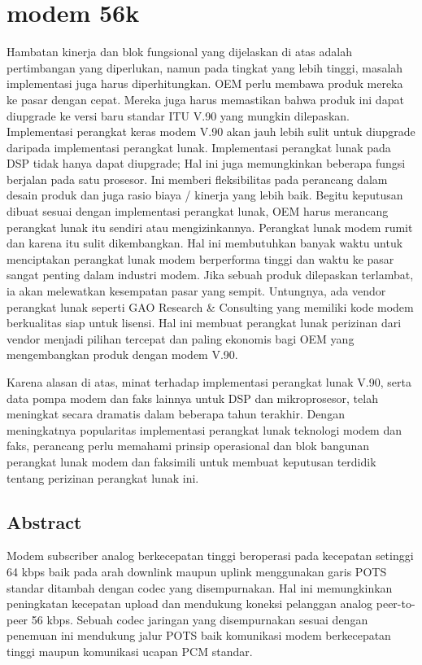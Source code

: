 \section{modem 56k}
Hambatan kinerja dan blok fungsional yang dijelaskan di atas adalah pertimbangan yang diperlukan, namun pada tingkat yang lebih tinggi, masalah implementasi juga harus diperhitungkan. OEM perlu membawa produk mereka ke pasar dengan cepat. Mereka juga harus memastikan bahwa produk ini dapat diupgrade ke versi baru standar ITU V.90 yang mungkin dilepaskan. Implementasi perangkat keras modem V.90 akan jauh lebih sulit untuk diupgrade daripada implementasi perangkat lunak. Implementasi perangkat lunak pada DSP tidak hanya dapat diupgrade; Hal ini juga memungkinkan beberapa fungsi berjalan pada satu prosesor. Ini memberi fleksibilitas pada perancang dalam desain produk dan juga rasio biaya / kinerja yang lebih baik. Begitu keputusan dibuat sesuai dengan implementasi perangkat lunak, OEM harus merancang perangkat lunak itu sendiri atau mengizinkannya. Perangkat lunak modem rumit dan karena itu sulit dikembangkan. Hal ini membutuhkan banyak waktu untuk menciptakan perangkat lunak modem berperforma tinggi dan waktu ke pasar sangat penting dalam industri modem. Jika sebuah produk dilepaskan terlambat, ia akan melewatkan kesempatan pasar yang sempit. Untungnya, ada vendor perangkat lunak seperti GAO Research \& Consulting yang memiliki kode modem berkualitas siap untuk lisensi. Hal ini membuat perangkat lunak perizinan dari vendor menjadi pilihan tercepat dan paling ekonomis bagi OEM yang mengembangkan produk dengan modem V.90.

Karena alasan di atas, minat terhadap implementasi perangkat lunak V.90, serta data pompa modem dan faks lainnya untuk DSP dan mikroprosesor, telah meningkat secara dramatis dalam beberapa tahun terakhir. Dengan meningkatnya popularitas implementasi perangkat lunak teknologi modem dan faks, perancang perlu memahami prinsip operasional dan blok bangunan perangkat lunak modem dan faksimili untuk membuat keputusan terdidik tentang perizinan perangkat lunak ini.

\subsection{Abstract}
Modem subscriber analog berkecepatan tinggi beroperasi pada kecepatan setinggi 64 kbps baik pada arah downlink maupun uplink menggunakan garis POTS standar ditambah dengan codec yang disempurnakan. Hal ini memungkinkan peningkatan kecepatan upload dan mendukung koneksi pelanggan analog peer-to-peer 56 kbps. Sebuah codec jaringan yang disempurnakan sesuai dengan penemuan ini mendukung jalur POTS baik komunikasi modem berkecepatan tinggi maupun komunikasi ucapan PCM standar.

